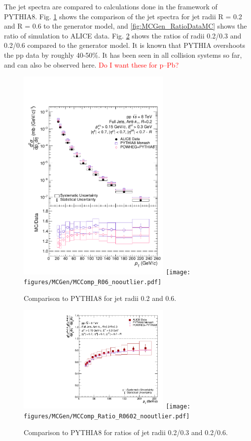 \documentclass[ALICE]{ALICE_analysis_notes}
\newcommand{\pPb}{{\mbox{p--Pb}}\xspace}
\newcommand{\pp}{pp\xspace}
\begin{document}
The jet spectra are compared to calculations done in the framework of PYTHIA8.
Fig. \ref{fig:MCGen} shows the comparison of the jet spectra for jet radii R = 0.2 and R = 0.6 to the generator model, and \ref{fig:MCGen_RatioDataMC} shows the ratio of simulation to ALICE data. Fig. \ref{fig:MCGen_Ratio} shows the ratios of radii 0.2/0.3 and 0.2/0.6 compared to the generator model. It is known that PYTHIA overshoots the \pp data by roughly 40-50\%. It has been seen in all collision systems so far, and can also be observed here. \textcolor{red}{Do I want these for \pPb?}

\begin{figure}
    \centering
    \begin{multicols}{2}
            \includegraphics[width=7.5cm]{figures/MCGen/MCComp_R02_nooutlier.pdf}
        \vfill\null
        \columnbreak
            \texttt{[image: figures/MCGen/MCComp\_R06\_nooutlier.pdf]}
        \vfill\null
    \end{multicols}
    \caption{Comparison to PYTHIA8 for jet radii 0.2 and 0.6.}
    \label{fig:MCGen}
\end{figure}

\begin{figure}
    \centering
    \begin{multicols}{2}
            \includegraphics[width=7.5cm]{figures/MCGen/MCComp_Ratio_R0302_nooutlier.pdf}
        \vfill\null
        \columnbreak
            \texttt{[image: figures/MCGen/MCComp\_Ratio\_R0602\_nooutlier.pdf]}
        \vfill\null
    \end{multicols}
    \caption{Comparison to PYTHIA8 for ratios of jet radii 0.2/0.3 and 0.2/0.6.}
    \label{fig:MCGen_Ratio}
\end{figure}
\end{document}
